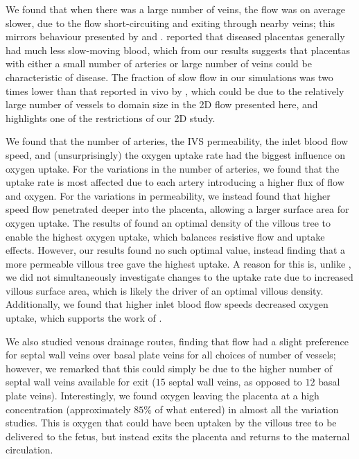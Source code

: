         We found that when there was a large number of veins, the flow was on average slower, due to the flow short-circuiting and exiting through nearby veins; this mirrors behaviour presented by \citeauthor{chernyavskyMathematicalModelIntervillous2010} \cite{chernyavskyMathematicalModelIntervillous2010} and \citeauthor{meklerImpactTissuePorosity2022} \cite{meklerImpactTissuePorosity2022}. \citeauthor{dellschaftHaemodynamicsHumanPlacenta2020} reported that diseased placentas generally had much less slow-moving blood, which from our results suggests that placentas with either a small number of arteries or large number of veins could be characteristic of disease. The fraction of slow flow in our simulations was two times lower than that reported in vivo by \citeauthor{dellschaftHaemodynamicsHumanPlacenta2020} \cite{dellschaftHaemodynamicsHumanPlacenta2020}, which could be due to the relatively large number of vessels to domain size in the 2D flow presented here, and highlights one of the restrictions of our 2D study.

        We found that the number of arteries, the IVS permeability, the inlet blood flow speed, and (unsurprisingly) the oxygen uptake rate had the biggest influence on oxygen uptake. For the variations in the number of arteries, we found that the uptake rate is most affected due to each artery introducing a higher flux of flow and oxygen. For the variations in permeability, we instead found that higher speed flow penetrated deeper into the placenta, allowing a larger surface area for oxygen uptake. The results of \citeauthor{serovOptimalVilliDensity2015} \cite{serovOptimalVilliDensity2015} found an optimal density of the villous tree to enable the highest oxygen uptake, which balances resistive flow and uptake effects. However, our results found no such optimal value, instead finding that a more permeable villous tree gave the highest uptake. A reason for this is, unlike \citeauthor{serovOptimalVilliDensity2015} \cite{serovOptimalVilliDensity2015}, we did not simultaneously investigate changes to the uptake rate due to increased villous surface area, which is likely the driver of an optimal villous density. Additionally, we found that higher inlet blood flow speeds decreased oxygen uptake, which supports the work of \citeauthor{burtonRheologicalPhysiologicalConsequences2009} \cite{burtonRheologicalPhysiologicalConsequences2009}.

        We also studied venous drainage routes, finding that flow had a slight preference for septal wall veins over basal plate veins for all choices of number of vessels; however, we remarked that this could simply be due to the higher number of septal wall veins available for exit ($15$ septal wall veins, as opposed to $12$ basal plate veins). Interestingly, we found oxygen leaving the placenta at a high concentration (approximately $85\%$ of what entered) in almost all the variation studies. This is oxygen that could have been uptaken by the villous tree to be delivered to the fetus, but instead exits the placenta and returns to the maternal circulation.

